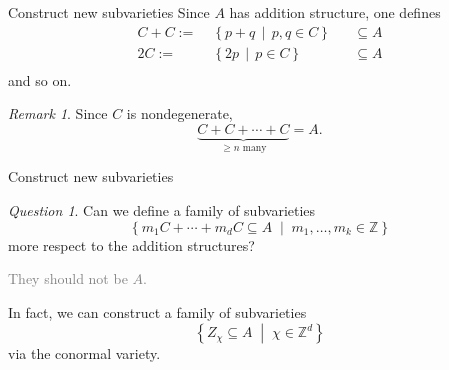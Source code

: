 \documentclass[pdf]{beamer}
\numberwithin{equation}{section}
\theoremstyle{plain}
\theoremstyle{plain}
\theoremstyle{remark}
\newtheorem{remark}[theorem]{Remark}
\newtheorem{question}[theorem]{Question}
\newcommand*{\ignore}[1]{\textcolor{gray}{#1}}
\begin{document}
\begin{frame}[fragile]{Construct new subvarieties}
Since $A$ has addition structure, one defines
\begin{equation*}
\begin{aligned}
  C+C:=\;& \left\{ p+q \,\middle|\, p,q \in C  \right\} &&\subseteq A  \\ 
  2C:=\;& \left\{ 2p \,\middle|\, p \in C  \right\} &&\subseteq A  \\ 
\end{aligned}
\end{equation*}
and so on.

\begin{remark}
Since $C$ is nondegenerate,
$$\underbrace{C + C + \cdots + C}_{\text{$\geqslant n$ many}} = A.$$
\end{remark}

\end{frame}

\begin{frame}[fragile]{Construct new subvarieties}
\begin{question}
Can we define a family of subvarieties
$$\left\{ m_1C+ \cdots + m_dC \subseteq A  \;\middle|\; m_1,\ldots,m_k \in \mathbb{Z} \right\}$$
more respect to the addition structures?

\ignore{They should not be $A$.}
\end{question}
In fact, we can construct a family of subvarieties
$$\left\{ Z_{\chi} \subseteq A  \;\middle|\; \chi \in \mathbb{Z}^d \right\}$$
via the conormal variety.
\end{frame}
\end{document}
